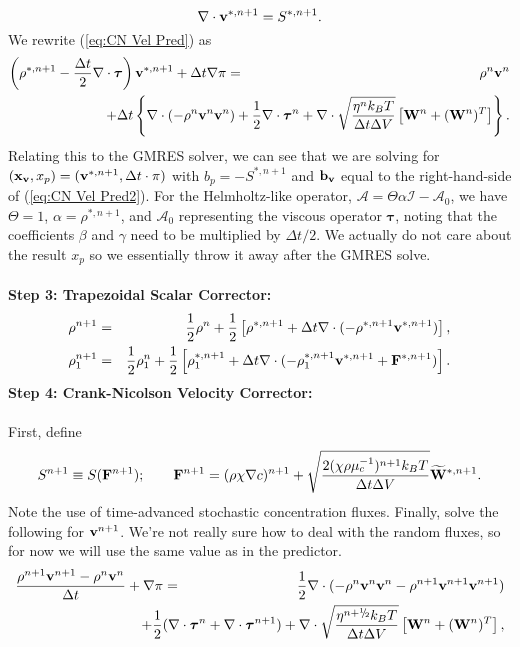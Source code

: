 \documentclass[final]{siamltex}
\newcommand{\sfrac}[2]{\mathchoice
  {\kern0em\raise.5ex\hbox{\the\scriptfont0 #1}\kern-.15em/
   \kern-.15em\lower.25ex\hbox{\the\scriptfont0 #2}}
  {\kern0em\raise.5ex\hbox{\the\scriptfont0 #1}\kern-.15em/
   \kern-.15em\lower.25ex\hbox{\the\scriptfont0 #2}}
  {\kern0em\raise.5ex\hbox{\the\scriptscriptfont0 #1}\kern-.2em/
   \kern-.15em\lower.25ex\hbox{\the\scriptscriptfont0 #2}}
  {#1\!/#2}}
\def\bb {{\bf b}}
\def\Fb {{\bf F}}
\def\vb {{\bf v}}
\def\Wb {{\bf W}}
\def\xb {{\bf x}}
\def\taub {\boldsymbol{\tau}}
\def\half   {\frac{1}{2}}
\def\myhalf {\sfrac{1}{2}}
\begin{document}
\begin{equation}
\nabla\cdot\vb^{*,n+1} = S^{*,n+1}.
\end{equation}
We rewrite (\ref{eq:CN Vel Pred}) as
\begin{eqnarray}
\left(\rho^{*,n+1} - \frac{\Delta t}{2}\nabla\cdot\taub\right)\vb^{*,n+1} + \Delta t\nabla\pi &=& \rho^n\vb^n\nonumber\\
&&\hspace{-1.5in}+ \Delta t\left\{\nabla\cdot(-\rho^n\vb^n\vb^n) + \half\nabla\cdot\taub^n + \nabla\cdot\sqrt{\frac{\eta^n k_B T}{\Delta t\Delta V}}\left[\Wb^n + (\Wb^n)^T\right]\right\}.\label{eq:CN Vel Pred2}
\end{eqnarray}
Relating this to the GMRES solver, we can see that we are solving for 
$(\xb_\vb,x_p) = (\vb^{*,n+1},\Delta t\cdot\pi)$ with $b_p = -S^{*,n+1}$ and $\bb_\vb$ equal to the 
right-hand-side of (\ref{eq:CN Vel Pred2}).  For the Helmholtz-like operator, 
$\mathcal{A}=\Theta\alpha\mathcal{I} - \mathcal{A}_0$, we have $\Theta=1$, $\alpha=\rho^{*,n+1}$,
and $\mathcal{A}_0$ representing the viscous operator $\taub$, noting that the coefficients
$\beta$ and $\gamma$ need to be multiplied by $\Delta t/2$.  We actually do not care about
the result $x_p$ so we essentially throw it away after the GMRES solve.\\ \\
{\bf Step 3: Trapezoidal Scalar Corrector:}
\begin{eqnarray}
\rho^{n+1} &=& \half\rho^n + \half\left[\rho^{*,n+1} + \Delta t\nabla\cdot(-\rho^{*,n+1}\vb^{*,n+1})\right],\\
\rho_1^{n+1} &=& \half\rho_1^n + \half\left[\rho_1^{*,n+1} + \Delta t\nabla\cdot(-\rho_1^{*,n+1}\vb^{*,n+1} + \Fb^{*,n+1})\right].
\end{eqnarray}
{\bf Step 4: Crank-Nicolson Velocity Corrector:}\\ \\
First, define
\begin{equation}
S^{n+1} \equiv S(\Fb^{n+1});
\qquad
\Fb^{n+1} = (\rho\chi\nabla c)^{n+1} + \sqrt{\frac{2(\chi\rho\mu_c^{-1})^{n+1}k_BT}{\Delta t\Delta V}}\widetilde\Wb^{*,n+1}.
\end{equation}
Note the use of time-advanced stochastic concentration fluxes.
Finally, solve the following for $\vb^{n+1}$.
We're not really sure how to deal with the random fluxes, so for now we will use 
the same value as in the predictor.
\begin{eqnarray}
\frac{\rho^{n+1}\vb^{n+1} - \rho^n\vb^n}{\Delta t} + \nabla\pi &=& \half\nabla\cdot(-\rho^n\vb^n\vb^n - \rho^{n+1}\vb^{n+1}\vb^{n+1})\nonumber\\
&&\hspace{-0.5in}+ \half(\nabla\cdot\taub^n + \nabla\cdot\taub^{n+1}) + \nabla\cdot\sqrt{\frac{\eta^{n+\myhalf} k_B T}{\Delta t\Delta V}}\left[\Wb^n + (\Wb^n)^T\right],\label{eq:CN Vel Corr}
\end{eqnarray}
\end{document}

